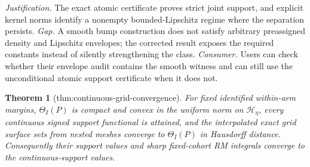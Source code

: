 \documentclass{article}
\newtheorem{theorem}{Theorem}
\begin{document}
\par\smallskip\noindent \textit{Justification.} The exact atomic certificate proves strict joint support, and explicit kernel norms identify a nonempty bounded-Lipschitz regime where the separation persists. \textit{Gap.} A smooth bump construction does not satisfy arbitrary preassigned density and Lipschitz envelopes; the corrected result exposes the required constants instead of silently strengthening the class. \textit{Consumer.} Users can check whether their envelope audit contains the smooth witness and can still use the unconditional atomic support certificate when it does not.

\begin{theorem}[thm:continuous-grid-convergence]\label{thm:continuous-grid-convergence}
For fixed identified within-arm margins, \(\Theta_I(P)\) is compact and convex in the uniform norm on \(\mathcal H_\eta\), every continuous signed support functional is attained, and the interpolated exact grid surface sets from nested meshes converge to \(\Theta_I(P)\) in Hausdorff distance. Consequently their support values and sharp fixed-cohort RM integrals converge to the continuous-support values.
\end{theorem}
\end{document}
